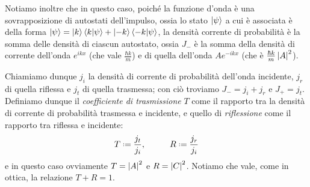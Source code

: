 Notiamo inoltre che in questo caso, poich\'e la funzione d'onda è una sovrapposizione di autostati dell'impulso, ossia lo stato $\left|{\psi}\right\rangle$ a cui è associata è della forma $\left|{\psi}\right\rangle=\left|{k}\right\rangle\left\langle{k}\middle|{\psi}\right\rangle+\left|{-k}\right\rangle\left\langle{-k}\middle|{\psi}\right\rangle$, la densità corrente di probabilità è la somma delle densità di ciascun autostato, ossia $J_-$ è la somma della densità di corrente dell'onda $e^{ikx}$ (che vale $\frac{\hbar k}{m}$) e di quella dell'onda $Ae^{-ikx}$ (che è $\frac{\hbar k}{m}\left|{A}\right|^2$).

Chiamiamo dunque $j_i$ la densità di corrente di probabilità dell'onda incidente, $j_r$ di quella riflessa e $j_t$ di quella trasmessa; con ciò troviamo $J_-=j_i+j_r$ e $J_+=j_t$.
Definiamo dunque il \emph{coefficiente di trasmissione} $T$ come il rapporto tra la densità di corrente di probabilità trasmessa e incidente, e quello di \emph{riflessione} come il rapporto tra riflessa e incidente:
\begin{equation}
	T\defeq\frac{j_t}{j_i},\hspace{1cm} R\defeq\frac{j_r}{j_i}
	\label{eq:coefficienti-trasmissione-riflessione}
\end{equation}
e in questo caso ovviamente $T=\left|{A}\right|^2$ e $R=\left|{C}\right|^2$.
Notiamo che vale, come in ottica, la relazione $T+R=1$.
